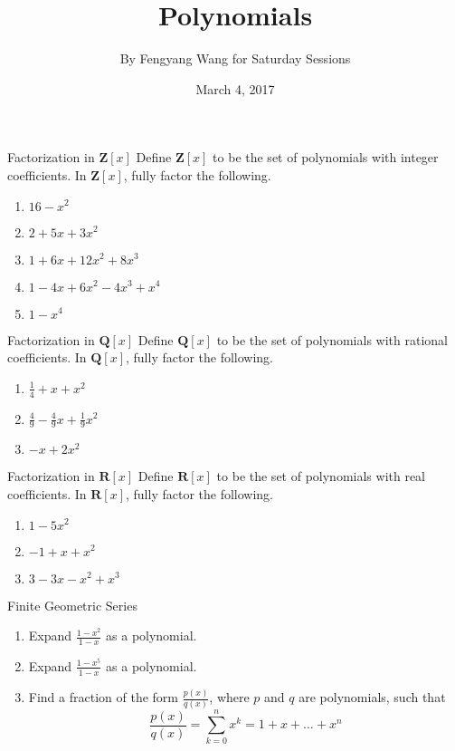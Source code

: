\documentclass[12pt,letterpaper]{article}
\title{Polynomials}
\author{By Fengyang Wang for Saturday Sessions}
\date{March 4, 2017}
\begin{document}
\HomeworkTitle
\begin{problem}{Factorization in \(\mathbf{Z}[x]\)}
  Define \(\mathbf{Z}[x]\) to be the set of polynomials with integer
  coefficients. In \(\mathbf{Z}[x]\), fully factor the following.

  \begin{enumerate}
    \item \(16 - x^2\)
    \item \(2 + 5x + 3x^2\)
    \item \(1 + 6x + 12x^2 + 8x^3\)
    \item \(1 - 4x + 6x^2 - 4x^3 + x^4\)
    \item \(1 - x^4\)
  \end{enumerate}
\end{problem}

\begin{problem}{Factorization in \(\mathbf{Q}[x]\)}
  Define \(\mathbf{Q}[x]\) to be the set of polynomials with rational
  coefficients. In \(\mathbf{Q}[x]\), fully factor the following.

  \begin{enumerate}
    \item \(\frac{1}{4} + x + x^2\)
    \item \(\frac{4}{9} - \frac{4}{9}x + \frac{1}{9}x^2\)
    \item \(-x + 2x^2\)
  \end{enumerate}
\end{problem}

\begin{problem}{Factorization in \(\mathbf{R}[x]\)}
  Define \(\mathbf{R}[x]\) to be the set of polynomials with real coefficients.
  In \(\mathbf{R}[x]\), fully factor the following.

  \begin{enumerate}
    \item \(1 - 5x^2\)
    \item \(-1 + x + x^2\)
    \item \(3 - 3x - x^2 + x^3\)
  \end{enumerate}
\end{problem}

\begin{problem}{Finite Geometric Series}
  \begin{enumerate}
    \item Expand \(\frac{1-x^2}{1-x}\) as a polynomial.
    \item Expand \(\frac{1-x^5}{1-x}\) as a polynomial.
    \item Find a fraction of the form \(\frac{p(x)}{q(x)}\), where \(p\) and
    \(q\) are polynomials, such that \[
      \frac{p(x)}{q(x)} = \sum_{k=0}^n x^k = 1 + x + \dots + x^n
    \]
  \end{enumerate}
\end{problem}
\end{document}
